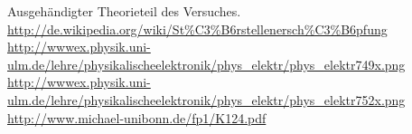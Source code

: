 Ausgehändigter Theorieteil des Versuches.
\url{http://de.wikipedia.org/wiki/St\%C3\%B6rstellenersch\%C3\%B6pfung}
\url{http://wwwex.physik.uni-ulm.de/lehre/physikalischeelektronik/phys_elektr/phys_elektr749x.png}
\url{http://wwwex.physik.uni-ulm.de/lehre/physikalischeelektronik/phys_elektr/phys_elektr752x.png}
\url{http://www.michael-unibonn.de/fp1/K124.pdf}